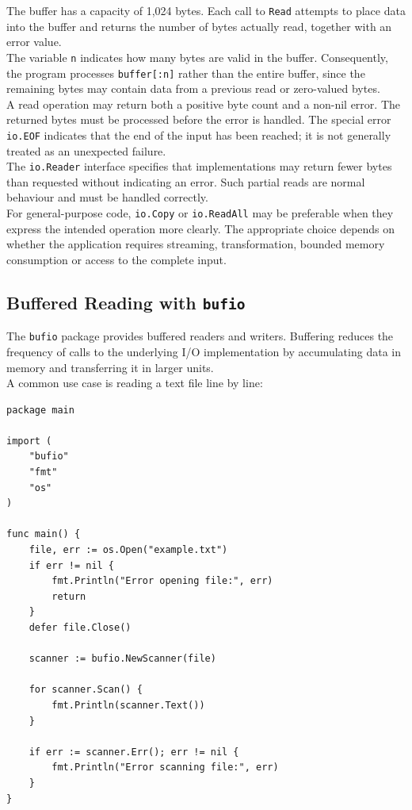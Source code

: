 The buffer has a capacity of 1,024 bytes. Each call to \texttt{Read} attempts to place data into the buffer and returns the number of bytes actually read, together with an error value.\\

The variable \texttt{n} indicates how many bytes are valid in the buffer. Consequently, the program processes \texttt{buffer[:n]} rather than the entire buffer, since the remaining bytes may contain data from a previous read or zero-valued bytes.\\

A read operation may return both a positive byte count and a non-nil error. The returned bytes must be processed before the error is handled. The special error \texttt{io.EOF} indicates that the end of the input has been reached; it is not generally treated as an unexpected failure.\\

The \texttt{io.Reader} interface specifies that implementations may return fewer bytes than requested without indicating an error. Such partial reads are normal behaviour and must be handled correctly.\\

For general-purpose code, \texttt{io.Copy} or \texttt{io.ReadAll} may be preferable when they express the intended operation more clearly. The appropriate choice depends on whether the application requires streaming, transformation, bounded memory consumption or access to the complete input.

\subsection{Buffered Reading with \texttt{bufio}}

The \texttt{bufio} package provides buffered readers and writers. Buffering reduces the frequency of calls to the underlying I/O implementation by accumulating data in memory and transferring it in larger units.\\

A common use case is reading a text file line by line:

\begin{lstlisting}
package main

import (
    "bufio"
    "fmt"
    "os"
)

func main() {
    file, err := os.Open("example.txt")
    if err != nil {
        fmt.Println("Error opening file:", err)
        return
    }
    defer file.Close()

    scanner := bufio.NewScanner(file)

    for scanner.Scan() {
        fmt.Println(scanner.Text())
    }

    if err := scanner.Err(); err != nil {
        fmt.Println("Error scanning file:", err)
    }
}
\end{lstlisting}

